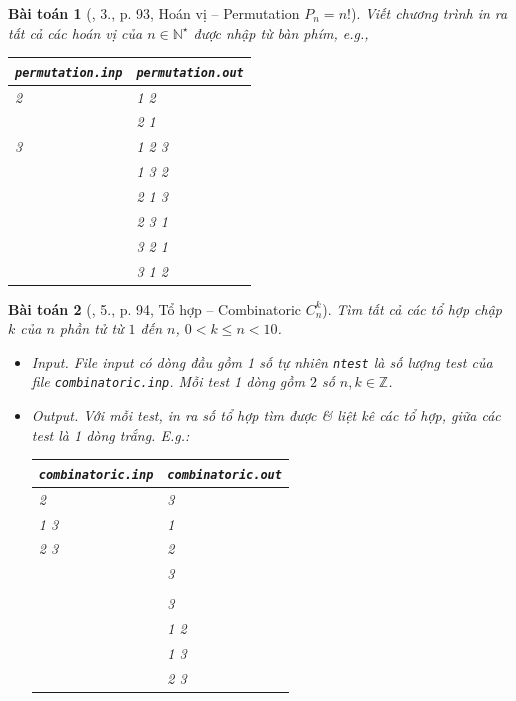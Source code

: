 \documentclass{article}
\newtheorem{baitoan}{Bài toán}
\begin{document}
\begin{baitoan}[\cite{VietSTEM2021}, 3., p. 93, Hoán vị -- Permutation $P_n = n!$]
	Viết chương trình in ra tất cả các hoán vị của $n\in\mathbb{N}^\star$ được nhập từ bàn phím, e.g.,
	\begin{table}[H]
		\centering
		\begin{tabular}{|l|l|}
			\hline
			{\tt permutation.inp} & {\tt permutation.out} \\
			\hline
			2 & 1 2 \\
			& 2 1 \\
			\hline
			3 & 1 2 3 \\
			& 1 3 2 \\
			& 2 1 3 \\
			& 2 3 1 \\
			& 3 2 1 \\
			& 3 1 2 \\
			\hline
		\end{tabular}
	\end{table}
\end{baitoan}

\begin{baitoan}[\cite{VietSTEM2021}, 5., p. 94, Tổ hợp -- Combinatoric $C_n^k$]
	Tìm tất cả các tổ hợp chập $k$ của $n$ phần tử từ $1$ đến $n$, $0 < k\le n < 10$.
	\begin{itemize}
		\item {\sf Input.} File input có dòng đầu gồm 1 số tự nhiên {\tt ntest} là số lượng test của file \verb|combinatoric.inp|. Mỗi test 1 dòng gồm $2$ số $n,k\in\mathbb{Z}$. 
		\item {\sf Output.} Với mỗi test, in ra số tổ hợp tìm được \& liệt kê các tổ hợp, giữa các test là 1 dòng trắng. E.g.:
		\begin{table}[H]
			\centering
			\begin{tabular}{|l|l|}
				\hline
				{\tt combinatoric.inp} & {\tt combinatoric.out} \\
				\hline
				2 & 3 \\
				1 3 & 1 \\
				2 3 & 2 \\
				& 3 \\
				& \\
				& 3 \\
				& 1 2 \\
				& 1 3 \\
				& 2 3 \\
				\hline
			\end{tabular}
		\end{table}
	\end{itemize}
\end{baitoan}
\end{document}
